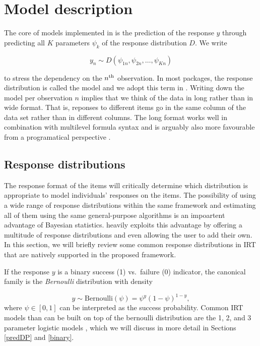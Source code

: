 \documentclass[jss]{jss}
\begin{document}
\hypertarget{model}{%
\section{Model description}\label{model}}

The core of models implemented in  is the prediction of the
response \(y\) through predicting all \(K\) parameters \(\psi_k\) of the
response distribution \(D\). We write

\[
y_n \sim D(\psi_{1n}, \psi_{2n}, \ldots, \psi_{Kn})
\]

to stress the dependency on the \(n\textsuperscript{th}\) observation.
In most  packages, the response distribution is called the
model  and we adopt this term in . Writing down
the model per observation \(n\) implies that we think of the data in
long rather than in wide format. That is, reponses to different items go
in the same column of the data set rather than in different columns. The
long format works well in combination with multilevel formula syntax and
is arguably also more favourable from a programatical perspective
\citep[e.g., see][]{wickham2016}.

\hypertarget{respdists}{%
\subsection{Response distributions}\label{respdists}}

The response format of the items will critically determine which
distribution is appropriate to model individuals' responses on the
items. The possibility of using a wide range of response distributions
within the same framework and estimating all of them using the same
general-purpose algorithms is an impoartent advantage of Bayesian
statistics.  heavily exploits this advantage by offering a
multitude of response distributions and even allowing the user to add
their own. In this section, we will briefly review some common response
distributions in IRT that are natively supported in the proposed
framework.

If the response \(y\) is a binary success (1) vs.~failure (0) indicator,
the canonical family is the \emph{Bernoulli} distribution with density

\[
y \sim \text{Bernoulli}(\psi) = \psi^y (1-\psi)^{1-y},
\] where \(\psi \in [0, 1]\) can be interpreted as the success
probability. Common IRT models than can be built on top of the bernoulli
distribution are the 1, 2, and 3 parameter logistic models \citep[1PL,
2PL, and 3PL models;][]{agresti2010}, which we will discuss in more
detail in Sections \ref{predDP} and \ref{binary}.
\end{document}
